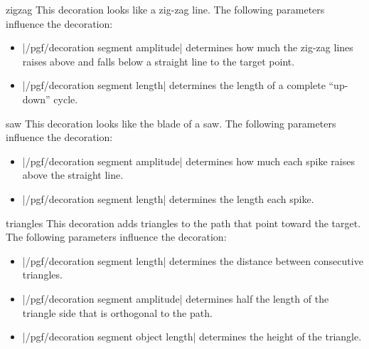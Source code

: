 \begin{decoration}{zigzag}
	This decoration looks like a zig-zag line. The following parameters
  influence the decoration:
  \begin{itemize}
  \item |/pgf/decoration segment amplitude|
    determines how much the zig-zag lines raises above and falls below
    a straight line to the target point.
  \item |/pgf/decoration segment length|
    determines the length of a complete ``up-down'' cycle.
  \end{itemize}
\begin{codeexample}[]
\end{codeexample}
\end{decoration}

\begin{decoration}{saw}
	This decoration looks like the blade of a saw. The following parameters
  influence the decoration:
  \begin{itemize}
  \item |/pgf/decoration segment amplitude|
    determines how much each spike raises above the straight line.
  \item |/pgf/decoration segment length|
    determines the length each spike.
  \end{itemize}
\begin{codeexample}[]
\end{codeexample}
\end{decoration}

\begin{decoration}{triangles}
	This decoration adds triangles to the path that point toward the
  target. The following parameters influence the decoration: 
  \begin{itemize}
  \item |/pgf/decoration segment length|
    determines the distance between consecutive triangles.
  \item |/pgf/decoration segment amplitude|
    determines half the length of the triangle side that is orthogonal
    to the path.
  \item |/pgf/decoration segment object length|
    determines the height of the triangle.
  \end{itemize}
\begin{codeexample}[]
\end{codeexample}
\end{decoration}


